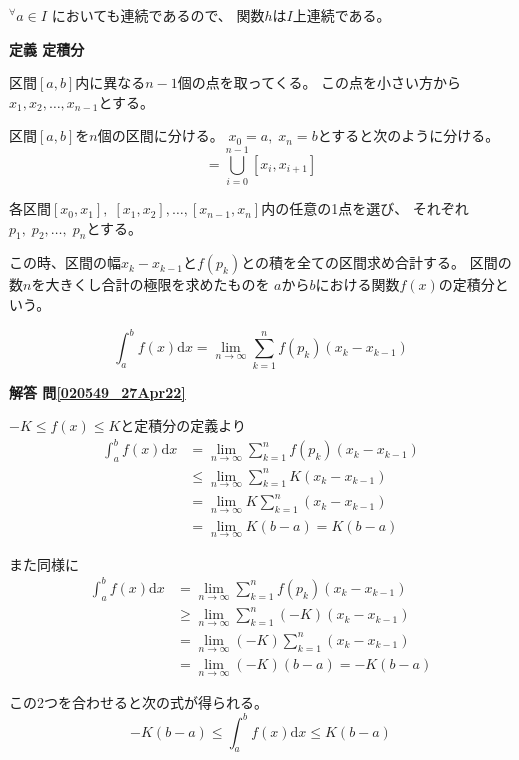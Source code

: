 \documentclass[12pt,b5paper]{ltjsarticle}
\begin{document}
${}^\forall a\in I$ においても連続であるので、
関数$h$は$I$上連続である。


\hrulefill

\textbf{定義 定積分}

区間$[a,b]$内に異なる$n-1$個の点を取ってくる。
この点を小さい方から$x_1, x_2, \dots , x_{n-1}$とする。

区間$[a,b]$を$n$個の区間に分ける。
$x_0=a,\; x_n=b$とすると次のように分ける。
\begin{equation}
 [a,b] = \bigcup_{i=0}^{n-1} [x_i, x_{i+1}]
\end{equation}

各区間$[x_0, x_{1}], \; [x_1, x_{2}], \dots ,[x_{n-1}, x_{n}]$内の任意の1点を選び、
それぞれ$p_1, \; p_2, \dots , \; p_n$とする。

この時、区間の幅$x_{k}-x_{k-1}$と$f(p_k)$との積を全ての区間求め合計する。
区間の数$n$を大きくし合計の極限を求めたものを
$a$から$b$における関数$f(x)$の定積分という。

\begin{equation}
 \int_a^b f(x)\mathrm{d}x
  = \lim_{n\rightarrow \infty} \sum_{k=1}^{n} f(p_k)(x_k-x_{k-1})
\end{equation}


\dotfill

\textbf{解答 問\ref{020549_27Apr22}}

$- K \leq f(x) \leq K$と定積分の定義より
\begin{align}
 \int_a^b f(x)\mathrm{d}x
  &= \lim_{n\rightarrow \infty} \sum_{k=1}^{n} f(p_k)(x_k-x_{k-1})\\
  &\leq \lim_{n\rightarrow \infty} \sum_{k=1}^{n} K(x_k-x_{k-1})\\
  &= \lim_{n\rightarrow \infty} K \sum_{k=1}^{n} (x_k-x_{k-1})\\
  &= \lim_{n\rightarrow \infty} K (b-a) = K (b-a)
\end{align}

また同様に
\begin{align}
 \int_a^b f(x)\mathrm{d}x
  &= \lim_{n\rightarrow \infty} \sum_{k=1}^{n} f(p_k)(x_k-x_{k-1})\\
  &\geq \lim_{n\rightarrow \infty} \sum_{k=1}^{n} (-K)(x_k-x_{k-1})\\
  &= \lim_{n\rightarrow \infty} (-K) \sum_{k=1}^{n} (x_k-x_{k-1})\\
  &= \lim_{n\rightarrow \infty} (-K) (b-a) = -K (b-a)
\end{align}

この2つを合わせると次の式が得られる。
\begin{equation}
 -K(b-a) \leq \int_a^b f(x)\mathrm{d}x \leq K(b-a)
\end{equation}
\end{document}
